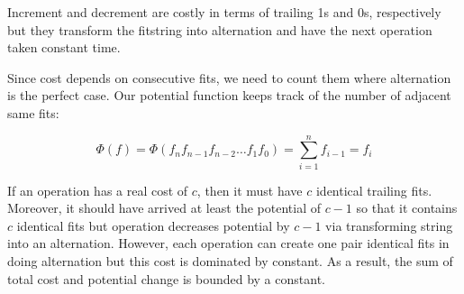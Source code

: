 Increment and decrement are costly in terms of trailing 1s and 0s, respectively but they transform the fitstring into alternation and have the next operation taken constant time.

Since cost depends on consecutive fits, we need to count them where alternation is the perfect case. Our potential function keeps track of the number of adjacent same fits:

$$
\Phi(f) = \Phi(f_{n}f_{n-1}f_{n-2} \dots f_{1}f_{0}) = \sum_{i=1}^{n} f_{i-1} = f_{i}
$$

If an operation has a real cost of $c$, then it must have $c$ identical trailing fits. Moreover, it should have arrived at least the potential of $c-1$ so that it contains $c$  identical fits but operation decreases potential by $c-1$ via transforming string into an alternation. However, each operation can create one pair identical fits in doing alternation but this cost is dominated by constant. As a result, the sum of total cost and potential change is bounded by a constant.
